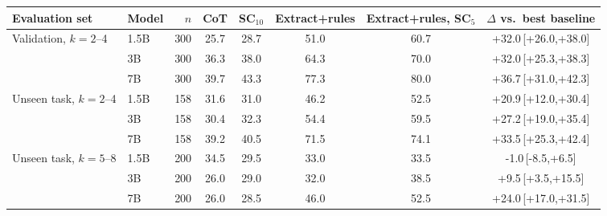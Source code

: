 \begin{tabular}{llrccccc}
\toprule
Evaluation set & Model & $n$ & CoT & SC$_{10}$ & Extract+rules & Extract+rules, SC$_5$ & $\Delta$ vs.\ best baseline \\
\midrule
Validation, $k{=}2$--4 & 1.5B & 300 & 25.7 & 28.7 & 51.0 & 60.7 & +32.0\,{\scriptsize[+26.0,+38.0]} \\
 & 3B & 300 & 36.3 & 38.0 & 64.3 & 70.0 & +32.0\,{\scriptsize[+25.3,+38.3]} \\
 & 7B & 300 & 39.7 & 43.3 & 77.3 & 80.0 & +36.7\,{\scriptsize[+31.0,+42.3]} \\
\midrule
Unseen task, $k{=}2$--4 & 1.5B & 158 & 31.6 & 31.0 & 46.2 & 52.5 & +20.9\,{\scriptsize[+12.0,+30.4]} \\
 & 3B & 158 & 30.4 & 32.3 & 54.4 & 59.5 & +27.2\,{\scriptsize[+19.0,+35.4]} \\
 & 7B & 158 & 39.2 & 40.5 & 71.5 & 74.1 & +33.5\,{\scriptsize[+25.3,+42.4]} \\
\midrule
Unseen task, $k{=}5$--8 & 1.5B & 200 & 34.5 & 29.5 & 33.0 & 33.5 & -1.0\,{\scriptsize[-8.5,+6.5]} \\
 & 3B & 200 & 26.0 & 29.0 & 32.0 & 38.5 & +9.5\,{\scriptsize[+3.5,+15.5]} \\
 & 7B & 200 & 26.0 & 28.5 & 46.0 & 52.5 & +24.0\,{\scriptsize[+17.0,+31.5]} \\
\bottomrule
\end{tabular}

